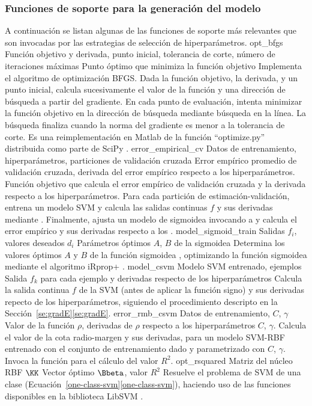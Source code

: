 %
\subsubsection{Funciones de soporte para la generación del modelo}
%
A continuación se listan algunas de las funciones de soporte más
relevantes que son invocadas por las estrategias de selección de
hiperparámetros.
%
\funcentry
    {opt\_bfgs}
    {Función objetivo y derivada, punto inicial,
      tolerancia de corte, número de iteraciones máximas}
    {Punto óptimo que minimiza la función objetivo}
    {Implementa el algoritmo de optimización BFGS.
      Dada la función objetivo, la derivada, y un punto inicial,
      calcula sucesivamente el valor de la función y una dirección de
      búsqueda a partir del gradiente.
      En cada punto de evaluación, intenta minimizar la función
      objetivo en la dirección de búsqueda mediante búsqueda en la
      línea.
      La búsqueda finaliza cuando la norma del gradiente es menor a la
      tolerancia de corte.
      Es una reimplementación en Matlab de la función ``optimize.py''
      distribuida como parte de SciPy \cite{scipy}.}
%
\funcentry
    {error\_empirical\_cv}
    {Datos de entrenamiento, hiperparámetros, particiones de
      validación cruzada}
    {Error empírico promedio de validación cruzada, derivada
      del error empírico respecto a los hiperparámetros.}
    {Función objetivo que calcula el error empírico de validación
      cruzada y la derivada respecto a los hiperparámetros.
      Para cada partición de estimación-validación, entrena un modelo
      SVM y calcula las salidas continuas $f$ y sus derivadas mediante
      .
      Finalmente, ajusta un modelo de sigmoidea invocando a
       y calcula el error empírico y sus
      derivadas respecto a los .}
%
\funcentry
    {model\_sigmoid\_train}
    {Salidas $f_i$, valores deseados $d_i$}
    {Parámetros óptimos $A$, $B$ de la sigmoidea}
    {Determina los valores óptimos $A$ y $B$ de la función sigmoidea
      \cite{abproblem}, optimizando la función sigmoidea mediante el
      algoritmo iRprop+ \cite{irpropplus}.}
%
\funcentry
    {model\_csvm}
    {Modelo SVM entrenado, ejemplos}
    {Salida $f_k$ para cada ejemplo y derivadas respecto de los
      hiperparámetros}
    {Calcula la salida continua $f$ de la SVM (antes de aplicar la
      función signo) y sus derivadas repecto de los hiperparámetros,
      siguiendo el procedimiento descripto en la
      \iflatexml{}Sección~\ref{se:gradE}\else\autoref{se:gradE}\fi{}.}
%
\funcentry
    {error\_rmb\_csvm}
    {Datos de entrenamiento, $C$, $\gamma$}
    {Valor de la función $\rho$, derivadas de $\rho$ respecto a los
      hiperparámetros $C$, $\gamma$.}
    {Calcula el valor de la cota radio-margen y sus derivadas, para un
      modelo SVM-RBF entrenado con el conjunto de entrenamiento dado y
      parametrizado con $C$, $\gamma$.
      Invoca la función  para el cálculo del valor
      $R^2$.}
%
\funcentry
    {opt\_rsquared}
    {Matriz del núcleo RBF $\KK$}
    {Vector óptimo $\Bbeta$, valor $R^2$}
    {Resuelve el problema de SVM de una clase
      (\iflatexml{}Ecuación~\ref{one-class-svm}\else\autoref{one-class-svm}\fi{}),
      haciendo uso de las funciones disponibles en la biblioteca
      LibSVM \cite{libsvm}.}
%
